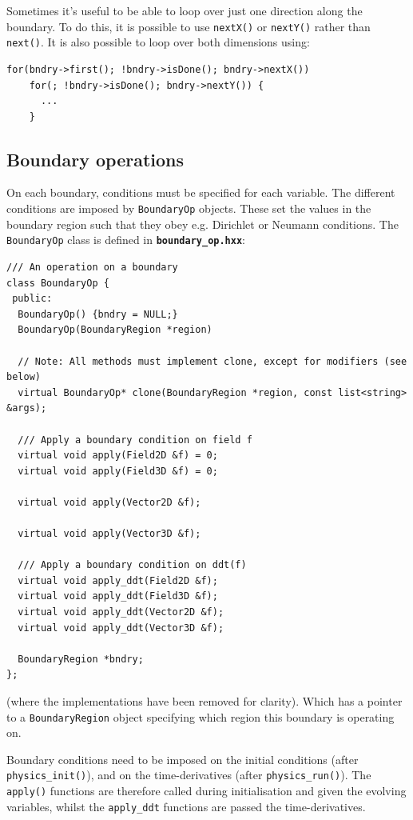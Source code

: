 \documentclass[12pt]{article}
\newcommand{\code}[1]{\texttt{#1}}
\newcommand{\file}[1]{\texttt{\bf #1}}
\begin{document}
Sometimes it's useful to be able to loop over just one direction along the
boundary. To do this, it is possible to use \code{nextX()} or \code{nextY()}
rather than \code{next()}. It is also possible to loop over both dimensions
using:
\begin{lstlisting}[numbers=none]
  for(bndry->first(); !bndry->isDone(); bndry->nextX())
    for(; !bndry->isDone(); bndry->nextY()) {
      ...
    }
\end{lstlisting}

\subsection{Boundary operations}

On each boundary, conditions must be specified for each variable.
The different conditions are imposed by \code{BoundaryOp} objects.
These set the values in the boundary region such that they obey e.g.
Dirichlet or Neumann conditions. The \code{BoundaryOp} class is defined
in \file{boundary\_op.hxx}: 
\begin{lstlisting}[firstnumber=21]
/// An operation on a boundary
class BoundaryOp {
 public:
  BoundaryOp() {bndry = NULL;}
  BoundaryOp(BoundaryRegion *region)

  // Note: All methods must implement clone, except for modifiers (see below)
  virtual BoundaryOp* clone(BoundaryRegion *region, const list<string> &args);

  /// Apply a boundary condition on field f
  virtual void apply(Field2D &f) = 0;
  virtual void apply(Field3D &f) = 0;

  virtual void apply(Vector2D &f);

  virtual void apply(Vector3D &f);

  /// Apply a boundary condition on ddt(f)
  virtual void apply_ddt(Field2D &f);
  virtual void apply_ddt(Field3D &f);
  virtual void apply_ddt(Vector2D &f);
  virtual void apply_ddt(Vector3D &f);

  BoundaryRegion *bndry;
};
\end{lstlisting}
(where the implementations have been removed for clarity).
Which has a pointer to a \code{BoundaryRegion} object specifying which
region this boundary is operating on.

Boundary conditions need to be imposed on the initial conditions (after
\code{physics\_init()}), and on the time-derivatives
(after \code{physics\_run()}). The \code{apply()} functions are therefore
called during initialisation and given the evolving variables, whilst the
\code{apply\_ddt} functions are passed the time-derivatives.
\end{document}
